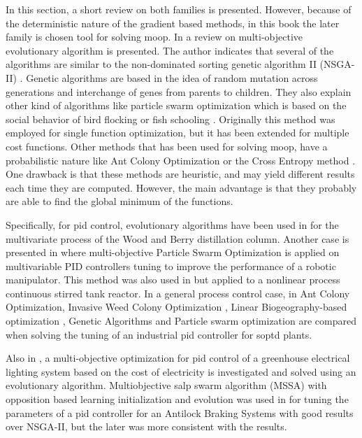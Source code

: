 In this section, a short review on both families is presented. However, because of the deterministic nature of the gradient based methods, in this book the later family is chosen tool for solving \gls{moop}.
%
In \citet{Zhou2011} a review on multi-objective evolutionary algorithm is presented. The author indicates that several of the algorithms are similar to the non-dominated sorting genetic algorithm II (NSGA-II) \citep{Deb2002}. Genetic algorithms are based in the idea of random mutation across generations and interchange of genes from parents to children. They also explain other kind of algorithms like particle swarm optimization which is based on the social behavior of bird flocking or fish schooling \citep{Eberhart1995}. Originally this method was employed for single function optimization, but it has been extended for multiple cost functions. Other methods that has been used for solving \gls{moop}, have a probabilistic nature like Ant Colony Optimization \citep{Dorigo2005} or the Cross Entropy method \citep{Rubinstein2004}. One drawback is that these methods are heuristic, and may yield different results each time they are computed. However, the main advantage is that they probably are able to find the global minimum of the functions.

Specifically, for \gls{pid} control, evolutionary algorithms have been used in \citet{Reynoso-Meza2012b} for the multivariate process of the Wood and Berry distillation column. Another case is presented in \citet{Pierezan2014} where multi-objective Particle Swarm Optimization is applied on multivariable PID controllers tuning to improve the performance of a robotic manipulator. This method was also used in \citet{Tian2014} but applied to a nonlinear process continuous stirred tank reactor. In a general process control case, in \citet{Cespedes2016} Ant Colony Optimization, Invasive Weed Colony Optimization \citep{Mehrabian2006}, Linear Biogeography-based optimization \citep{Simon2008}, Genetic Algorithms and Particle swarm optimization are compared when solving the tuning of an industrial \gls{pid} controller for \gls{soptd} plants.

Also in \citet{Mahdavian2014}, a multi-objective optimization for \gls{pid} control of a greenhouse electrical lighting system based on the cost of electricity is investigated and solved using an evolutionary algorithm. Multiobjective salp swarm algorithm (MSSA) with opposition based learning initialization and evolution was used in \citet{Domingues2019} for tuning the parameters of a \gls{pid} controller for an Antilock Braking Systems with good results over NSGA-II, but the later was more consistent with the results.

